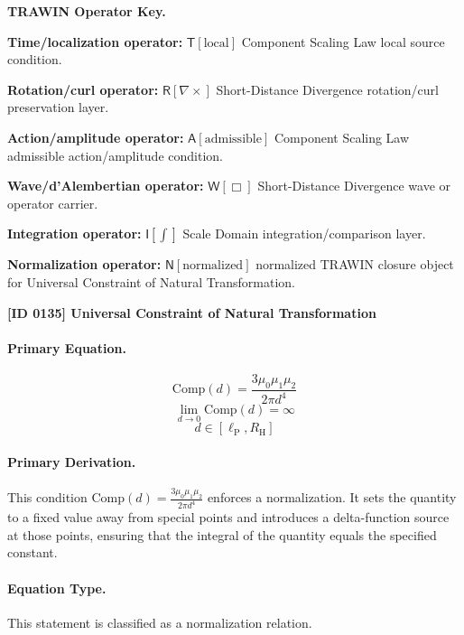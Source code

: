 \par\vspace{0.45\baselineskip}
\noindent\begin{minipage}[t]{\linewidth}
\begingroup
\small
\raggedright
\textbf{TRAWIN Operator Key.}\par
\noindent\textbf{Time/localization operator:} $\mathsf{T}\!\left[\mathrm{local}\right]$ Component Scaling Law local source condition.\par
\noindent\textbf{Rotation/curl operator:} $\mathsf{R}\!\left[\nabla\times\right]$ Short-Distance Divergence rotation/curl preservation layer.\par
\noindent\textbf{Action/amplitude operator:} $\mathsf{A}\!\left[\mathrm{admissible}\right]$ Component Scaling Law admissible action/amplitude condition.\par
\noindent\textbf{Wave/d'Alembertian operator:} $\mathsf{W}\!\left[\Box\right]$ Short-Distance Divergence wave or operator carrier.\par
\noindent\textbf{Integration operator:} $\mathsf{I}\!\left[\int\right]$ Scale Domain integration/comparison layer.\par
\noindent\textbf{Normalization operator:} $\mathsf{N}\!\left[\mathrm{normalized}\right]$ normalized TRAWIN closure object for Universal Constraint of Natural Transformation.\par
\endgroup
\end{minipage}

\clearpage
\noindent\textbf{[ID 0135] Universal Constraint of Natural Transformation}\par
\vspace{0.35em}
\paragraph{Primary Equation.}
\[
\mathrm{Comp}(d)=\frac{3\mu_0\mu_1\mu_2}{2\pi d^4}
\]
\[
\lim_{d\to 0}\mathrm{Comp}(d)=\infty
\]
\[
d\in [\ell_{\mathrm{P}},R_{\mathrm{H}}]
\]

\paragraph{Primary Derivation.}
This condition \( \mathrm{Comp}(d)=\frac{3\mu_0\mu_1\mu_2}{2\pi d^4} \) enforces a normalization. It sets the quantity to a fixed value away from special points and introduces a delta-function source at those points, ensuring that the integral of the quantity equals the specified constant.
\paragraph{Equation Type.}
This statement is classified as a normalization relation.

